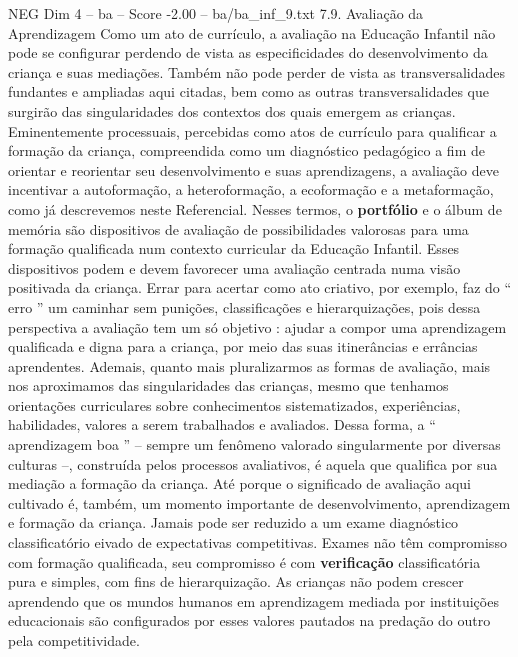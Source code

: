 \begin{textsample}{NEG Dim 4 – ba – Score -2.00 – ba/ba\_inf\_9.txt}  \label{ex:f4_neg_263}
7.9.
Avaliação da Aprendizagem Como um ato de currículo, a avaliação na Educação Infantil não pode se configurar perdendo de vista as especificidades do desenvolvimento da criança e suas mediações.
Também não pode perder de vista as transversalidades fundantes e ampliadas aqui citadas, bem como as outras transversalidades que surgirão das singularidades dos contextos dos quais emergem as crianças.
Eminentemente processuais, percebidas como atos de currículo para qualificar a formação da criança, compreendida como um diagnóstico pedagógico a fim de orientar e reorientar seu desenvolvimento e suas aprendizagens, a avaliação deve incentivar a autoformação, a heteroformação, a ecoformação e a metaformação, como já descrevemos neste Referencial.
Nesses termos, o \textbf{portfólio} e o álbum de memória são dispositivos de avaliação de possibilidades valorosas para uma formação qualificada num contexto curricular da Educação Infantil.
Esses dispositivos podem e devem favorecer uma avaliação centrada numa visão positivada da criança.
Errar para acertar como ato criativo, por exemplo, faz do “ erro ” um caminhar sem punições, classificações e hierarquizações, pois dessa perspectiva a avaliação tem um só objetivo : ajudar a compor uma aprendizagem qualificada e digna para a criança, por meio das suas itinerâncias e errâncias aprendentes.
Ademais, quanto mais pluralizarmos as formas de avaliação, mais nos aproximamos das singularidades das crianças, mesmo que tenhamos orientações curriculares sobre conhecimentos sistematizados, experiências, habilidades, valores a serem trabalhados e avaliados.
Dessa forma, a “ aprendizagem boa ” – sempre um fenômeno valorado singularmente por diversas culturas –, construída pelos processos avaliativos, é aquela que qualifica por sua mediação a formação da criança.
Até porque o significado de avaliação aqui cultivado é, também, um momento importante de desenvolvimento, aprendizagem e formação da criança.
Jamais pode ser reduzido a um exame diagnóstico classificatório eivado de expectativas competitivas.
Exames não têm compromisso com formação qualificada, seu compromisso é com \textbf{verificação} classificatória pura e simples, com fins de hierarquização.
As crianças não podem crescer aprendendo que os mundos humanos em aprendizagem mediada por instituições educacionais são configurados por esses valores pautados na predação do outro pela competitividade.

\end{textsample}
